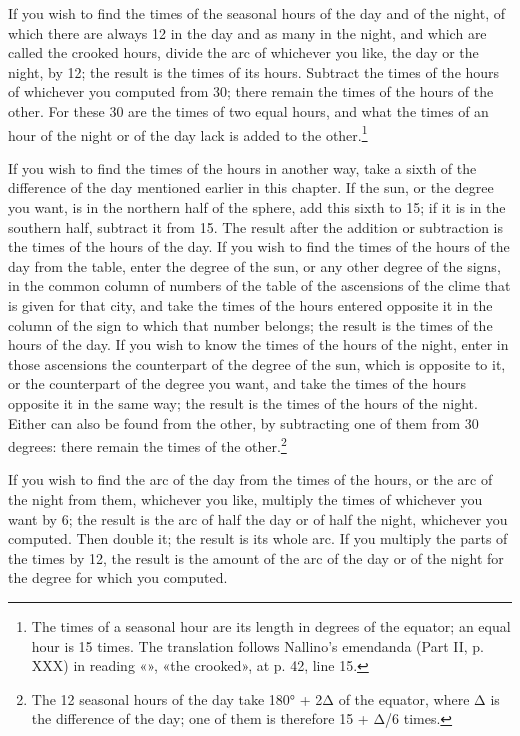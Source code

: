 \documentclass[11pt]{article}
\newcommand{\ArPage}[1]{\marginpar{\footnotesize\color{gray}Ar.\,p.\,#1}}
\begin{document}
\par If you wish to find the times of the seasonal hours of the day and of the night, of which there are always 12 in the day and as many in the night, and which are called the crooked hours, divide the arc of whichever you like, the day or the night, by 12; the result is the times of its hours. Subtract the times of the hours of whichever you computed from 30; there remain the times of the hours of the other. For these 30 are the times of two equal hours, and what the times of an hour of the night or of the day lack is added to the other.\footnote{The times of a seasonal hour are its length in degrees of the equator; an equal hour is 15 times. The translation follows Nallino's emendanda (Part II, p. XXX) in reading «», «the crooked», at p. 42, line 15.}\par
\par \ArPage{43}If you wish to find the times of the hours in another way, take a sixth of the difference of the day mentioned earlier in this chapter. If the sun, or the degree you want, is in the northern half of the sphere, add this sixth to 15; if it is in the southern half, subtract it from 15. The result after the addition or subtraction is the times of the hours of the day. If you wish to find the times of the hours of the day from the table, enter the degree of the sun, or any other degree of the signs, in the common column of numbers of the table of the ascensions of the clime that is given for that city, and take the times of the hours entered opposite it in the column of the sign to which that number belongs; the result is the times of the hours of the day. If you wish to know the times of the hours of the night, enter in those ascensions the counterpart of the degree of the sun, which is opposite to it, or the counterpart of the degree you want, and take the times of the hours opposite it in the same way; the result is the times of the hours of the night. Either can also be found from the other, by subtracting one of them from 30 degrees: there remain the times of the other.\footnote{The 12 seasonal hours of the day take 180° + 2Δ of the equator, where Δ is the difference of the day; one of them is therefore 15 + Δ/6 times.}\par
\par If you wish to find the arc of the day from the times of the hours, or the arc of the night from them, whichever you like, multiply the times of whichever you want by 6; the result is the arc of half the day or of half the night, whichever you computed. Then double it; the result is its whole arc. If you multiply the parts of the times by 12, the result is the amount of the arc of the day or of the night for the degree for which you computed.\par
\end{document}
